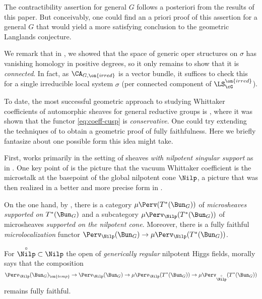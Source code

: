 \documentclass[9pt]{amsart}
\theoremstyle{remark}
\theoremstyle{definition}
\theoremstyle{remark}
\numberwithin{equation}{section}
\begin{document}
The contractibility assertion for general $G$ follows a posteriori from the results of this paper. 
But conceivably, one could find an a priori proof of this assertion for a general $G$ that would 
yield a more satisfying conclusion to the geometric Langlands conjecture. 

\medskip

We remark that in \cite[Corollary 4.5.5]{GLC4}, we showed that the space of generic oper structures on 
$\sigma$ has vanishing homology in positive degrees, so it only remains to show that it  
is \emph{connected}. In fact, as $\CA_{G,\on{irred}}$ is a vector bundle, it suffices
to check this for a single irreducible local system $\sigma$ (per connected component of
$\LS_{\cG}^{\on{irred}}$).



To date, the most successful geometric approach to studying 
Whittaker coefficients of automorphic sheaves for general reductive groups is \cite{FR},
where it was shown that the functor \eqref{eq:coeff-cusp} is \emph{conservative}. 
One could try extending the techniques of \cite{FR} to obtain a geometric proof of
fully faithfulness. Here we briefly fantasize about one
possible form this idea might take.

\medskip 

First, \cite{FR} works primarily in the setting of sheaves \emph{with nilpotent singular support} 
as in \cite{AGKRRV}. One key point of \cite{FR} is the picture that the vacuum Whittaker
coefficient is the microstalk at the basepoint of the global nilpotent cone $\Nilp$, a picture
that was then realized in a better and more precise form in \cite{NT}. 

\medskip 

On the one hand, by \cite{Wa}, there is a category $\mu\Perv(T^*(\Bun_G))$
of \emph{microsheaves 
supported on $T^*(\Bun_G)$} and 
a subcategory $\mu\Perv_\Nilp(T^*(\Bun_G))$ of microsheaves
\emph{supported on the nilpotent cone}. Moreover, there is a 
fully faithful \emph{microlocalization} functor 
$\Perv_{\Nilp}(\Bun_G) \to \mu\Perv_{\Nilp}(T^*(\Bun_G))$. 

\medskip 

For $\overset{\circ}{\Nilp}\subset \Nilp$ the open of \emph{generically regular} 
nilpotent Higgs fields, \cite[Theorem G]{FR} morally says that
the composition 
$$\Perv_{\Nilp}(\Bun_G)_{\on{temp}} \to \Perv_{\Nilp}(\Bun_G) \to \mu\Perv_{\Nilp}(T^*(\Bun_G))
\to \mu\Perv_{\overset{\circ}{\Nilp}}(T^*(\Bun_G))$$
remains fully faithful. 
\end{document}
